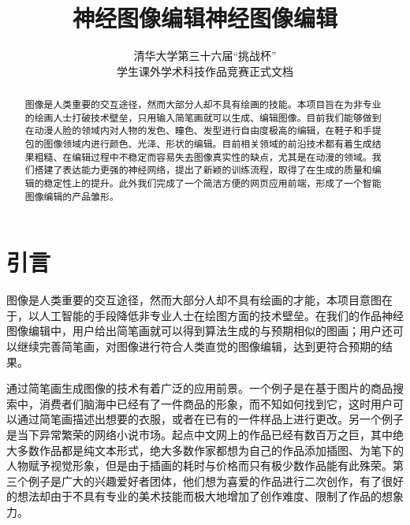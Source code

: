 \documentclass[a4paper,12pt,UTF8]{ctexart}
\title{神经图像编辑}
\begin{document}
\pagestyle{fancy}
\lhead{}
\rhead{}

\title{{\Huge 神经图像编辑}}
\author{\Large 清华大学第三十六届``挑战杯'' \\ \Large 学生课外学术科技作品竞赛正式文档}
\date{}
\maketitle

\newpage
\tableofcontents
\newpage

\begin{abstract}

图像是人类重要的交互途径，然而大部分人却不具有绘画的技能。本项目旨在为非专业的绘画人士打破技术壁垒，只用输入简笔画就可以生成、编辑图像。目前我们能够做到在动漫人脸的领域内对人物的发色、瞳色、发型进行自由度极高的编辑，在鞋子和手提包的图像领域内进行颜色、光泽、形状的编辑。目前相关领域的前沿技术都有着生成结果粗糙、在编辑过程中不稳定而容易失去图像真实性的缺点，尤其是在动漫的领域。我们搭建了表达能力更强的神经网络，提出了新颖的训练流程，取得了在生成的质量和编辑的稳定性上的提升。此外我们完成了一个简洁方便的网页应用前端，形成了一个智能图像编辑的产品雏形。

\end{abstract}

\section{引言}

图像是人类重要的交互途径，然而大部分人却不具有绘画的才能，本项目意图在于，以人工智能的手段降低非专业人士在绘图方面的技术壁垒。在我们的作品神经图像编辑中，用户给出简笔画就可以得到算法生成的与预期相似的图画；用户还可以继续完善简笔画，对图像进行符合人类直觉的图像编辑，达到更符合预期的结果。

通过简笔画生成图像的技术有着广泛的应用前景。一个例子是在基于图片的商品搜索中，消费者们脑海中已经有了一件商品的形象，而不知如何找到它，这时用户可以通过简笔画描述出想要的衣服，或者在已有的一件样品上进行更改。另一个例子是当下异常繁荣的网络小说市场。起点中文网上的作品已经有数百万之巨，其中绝大多数作品都是纯文本形式，绝大多数作家都想为自己的作品添加插图、为笔下的人物赋予视觉形象，但是由于插画的耗时与价格而只有极少数作品能有此殊荣。第三个例子是广大的兴趣爱好者团体，他们想为喜爱的作品进行二次创作，有了很好的想法却由于不具有专业的美术技能而极大地增加了创作难度、限制了作品的想象力。
\end{document}
